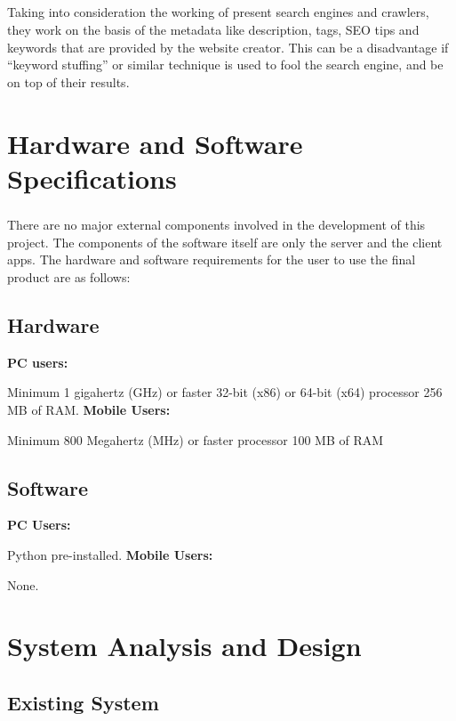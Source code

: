 \documentclass[a4paper]{report}
\begin{document}
\paragraph{}
\large\textnormal{Taking into consideration the working of present search engines and crawlers, they work on the basis of the metadata like description, tags, SEO tips and keywords that are provided by the website creator. This can be a disadvantage if “keyword stuffing” or similar technique is used to fool the search engine, and be on top of their results.}

\chapter{Hardware and Software Specifications}
\paragraph{}
\large\textnormal{There are no major external components involved in the development of this project. The components of the software itself are only the server and the client apps.}
\large\textnormal{The hardware and software requirements for the user to use the final 
product are as follows:}
\section{Hardware}


\textbf{PC users:}

Minimum 1 gigahertz (GHz) or faster 32-bit (x86) or 64-bit (x64) processor 256 MB of RAM.\newline
\textbf{Mobile Users:}

Minimum 800 Megahertz (MHz) or faster processor 100 MB of RAM

\section{Software}


\textbf{PC Users:}

Python pre-installed.\newline
\textbf{Mobile Users:}

None.

\chapter{System Analysis and Design}

\section{Existing System}
\end{document}
